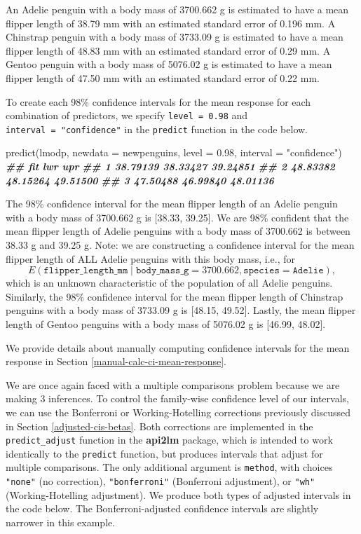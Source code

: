 \documentclass[
]{book}
\newenvironment{Shaded}{\begin{snugshade}}{\end{snugshade}}
\newcommand{\AttributeTok}[1]{\textcolor[rgb]{0.77,0.63,0.00}{#1}}
\newcommand{\DocumentationTok}[1]{\textcolor[rgb]{0.56,0.35,0.01}{\textbf{\textit{#1}}}}
\newcommand{\FloatTok}[1]{\textcolor[rgb]{0.00,0.00,0.81}{#1}}
\newcommand{\FunctionTok}[1]{\textcolor[rgb]{0.00,0.00,0.00}{#1}}
\newcommand{\NormalTok}[1]{#1}
\newcommand{\StringTok}[1]{\textcolor[rgb]{0.31,0.60,0.02}{#1}}
\theoremstyle{definition}
\theoremstyle{definition}
\theoremstyle{definition}
\theoremstyle{definition}
\theoremstyle{remark}
\begin{document}
An Adelie penguin with a body mass of 3700.662 g is estimated to have a mean flipper length of 38.79 mm with an estimated standard error of 0.196 mm. A Chinstrap penguin with a body mass of 3733.09 g is estimated to have a mean flipper length of 48.83 mm with an estimated standard error of 0.29 mm. A Gentoo penguin with a body mass of 5076.02 g is estimated to have a mean flipper length of 47.50 mm with an estimated standard error of 0.22 mm.

To create each 98\% confidence intervals for the mean response for each combination of predictors, we specify \texttt{level\ =\ 0.98} and \texttt{interval\ =\ "confidence"} in the \texttt{predict} function in the code below.

\begin{Shaded}
\begin{Highlighting}[]
\FunctionTok{predict}\NormalTok{(lmodp, }\AttributeTok{newdata =}\NormalTok{ newpenguins, }\AttributeTok{level =} \FloatTok{0.98}\NormalTok{, }\AttributeTok{interval =} \StringTok{"confidence"}\NormalTok{)}
\DocumentationTok{\#\#        fit      lwr      upr}
\DocumentationTok{\#\# 1 38.79139 38.33427 39.24851}
\DocumentationTok{\#\# 2 48.83382 48.15264 49.51500}
\DocumentationTok{\#\# 3 47.50488 46.99840 48.01136}
\end{Highlighting}
\end{Shaded}

The 98\% confidence interval for the mean flipper length of an Adelie penguin with a body mass of 3700.662 g is {[}38.33, 39.25{]}. We are 98\% confident that the mean flipper length of Adelie penguins with a body mass of 3700.662 is between 38.33 g and 39.25 g. Note: we are constructing a confidence interval for the mean flipper length of ALL
Adelie penguins with this body mass, i.e., for
\[
E(\mathtt{flipper\_length\_mm}\mid \mathtt{body\_mass\_g} = 3700.662, \mathtt{species} = \mathtt{Adelie}),
\]
which is an unknown characteristic of the population of all Adelie penguins. Similarly, the 98\% confidence interval for the mean flipper length of Chinstrap penguins with a body mass of 3733.09 g is {[}48.15, 49.52{]}. Lastly, the mean flipper length of Gentoo penguins with a body mass of 5076.02 g is {[}46.99, 48.02{]}.

We provide details about manually computing confidence intervals for the mean response in Section \ref{manual-calc-ci-mean-response}.

We are once again faced with a multiple comparisons problem because we are making 3 inferences. To control the family-wise confidence level of our intervals, we can use the Bonferroni or Working-Hotelling corrections previously discussed in Section \ref{adjusted-cis-betas}. Both corrections are implemented in the \texttt{predict\_adjust} function in the \textbf{api2lm} package, which is intended to work identically to the \texttt{predict} function, but produces intervals that adjust for multiple comparisons. The only additional argument is \texttt{method}, with choices \texttt{"none"} (no correction), \texttt{"bonferroni"} (Bonferroni adjustment), or \texttt{"wh"} (Working-Hotelling adjustment). We produce both types of adjusted intervals in the code below. The Bonferroni-adjusted confidence intervals are slightly narrower in this example.
\end{document}
